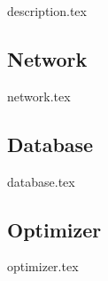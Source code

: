 {description.tex}
\newpage

\subsection{Network} \label{sec:NN}
{network.tex}
\newpage

\subsection{Database} \label{sec:DB}
{database.tex}
\newpage

\subsection{Optimizer} \label{sec:opt}
{optimizer.tex}
\newpage
